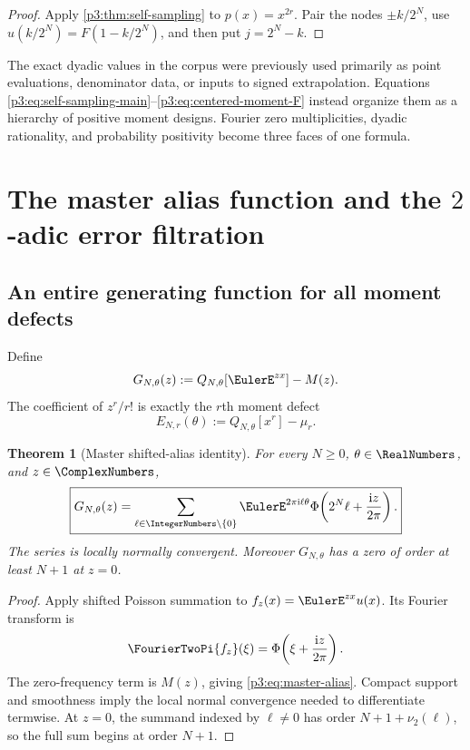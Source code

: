 \documentclass[11pt,oneside]{article}
\numberwithin{equation}{section}
\newtheorem{theorem}{Theorem}[section]
\theoremstyle{definition}
\theoremstyle{remark}
\begin{document}
\begin{proof}
Apply \cref{p3:thm:self-sampling} to $p(x)=x^{2r}$.  Pair the nodes $\pm k/2^N$, use $u(k/2^N)=F(1-k/2^N)$, and then put $j=2^N-k$.
\end{proof}

\begin{resultbox}
The exact dyadic values in the corpus were previously used primarily as point evaluations, denominator data, or inputs to signed extrapolation.  Equations \eqref{p3:eq:self-sampling-main}--\eqref{p3:eq:centered-moment-F} instead organize them as a hierarchy of positive moment designs.  Fourier zero multiplicities, dyadic rationality, and probability positivity become three faces of one formula.
\end{resultbox}

\section{The master alias function and the $2$-adic error filtration}
\label{p3:sec:alias}

\subsection{An entire generating function for all moment defects}

Define
\begin{equation}
 G_{N,\theta}(z)
 :=Q_{N,\theta}[\EulerE^{zx}]-M(z).
 \label{p3:eq:G-def}
\end{equation}
The coefficient of $z^r/r!$ is exactly the $r$th moment defect
\begin{equation}
 E_{N,r}(\theta)
 :=Q_{N,\theta}[x^r]-\mu_r.
 \label{p3:eq:ENr-def}
\end{equation}

\begin{theorem}[Master shifted-alias identity]
\label{p3:thm:master-alias}
For every $N\ge0$, $\theta\in\RealNumbers$, and $z\in\ComplexNumbers$,
\begin{equation}
 \boxed{\displaystyle
 G_{N,\theta}(z)
 =\sum_{\ell\in\IntegerNumbers\setminus\{0\}}
 \EulerE^{2\pi\iu\ell\theta}
 \Phi\!\left(2^N\ell+\frac{\iu z}{2\pi}\right).}
 \label{p3:eq:master-alias}
\end{equation}
The series is locally normally convergent.  Moreover $G_{N,\theta}$ has a zero of order at least $N+1$ at $z=0$.
\end{theorem}

\begin{proof}
Apply shifted Poisson summation to $f_z(x)=\EulerE^{zx}u(x)$.  Its Fourier transform is
\[
 \FourierTwoPi{f_z}(\xi)
 =\Phi\!\left(\xi+\frac{\iu z}{2\pi}\right).
\]
The zero-frequency term is $M(z)$, giving \eqref{p3:eq:master-alias}.  Compact support and smoothness imply the local normal convergence needed to differentiate termwise.  At $z=0$, the summand indexed by $\ell\ne0$ has order
$N+1+\nu_2(\ell)$, so the full sum begins at order $N+1$.
\end{proof}
\end{document}
